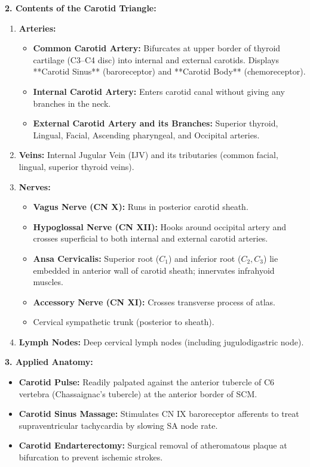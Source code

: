 \documentclass[11pt,a4paper]{article}
\begin{document}
\begin{ansbox}
\textbf{2. Contents of the Carotid Triangle:}
\begin{enumerate}[leftmargin=*]
    \item \textbf{Arteries:}
    \begin{itemize}
        \item \textbf{Common Carotid Artery:} Bifurcates at upper border of thyroid cartilage (C3--C4 disc) into internal and external carotids. Displays **Carotid Sinus** (baroreceptor) and **Carotid Body** (chemoreceptor).
        \item \textbf{Internal Carotid Artery:} Enters carotid canal without giving any branches in the neck.
        \item \textbf{External Carotid Artery and its Branches:} Superior thyroid, Lingual, Facial, Ascending pharyngeal, and Occipital arteries.
    \end{itemize}
    \item \textbf{Veins:} Internal Jugular Vein (IJV) and its tributaries (common facial, lingual, superior thyroid veins).
    \item \textbf{Nerves:}
    \begin{itemize}
        \item \textbf{Vagus Nerve (CN X):} Runs in posterior carotid sheath.
        \item \textbf{Hypoglossal Nerve (CN XII):} Hooks around occipital artery and crosses superficial to both internal and external carotid arteries.
        \item \textbf{Ansa Cervicalis:} Superior root ($C_1$) and inferior root ($C_2, C_3$) lie embedded in anterior wall of carotid sheath; innervates infrahyoid muscles.
        \item \textbf{Accessory Nerve (CN XI):} Crosses transverse process of atlas.
        \item Cervical sympathetic trunk (posterior to sheath).
    \end{itemize}
    \item \textbf{Lymph Nodes:} Deep cervical lymph nodes (including jugulodigastric node).
\end{enumerate}

\textbf{3. Applied Anatomy:}
\begin{itemize}[leftmargin=*]
    \item \textbf{Carotid Pulse:} Readily palpated against the anterior tubercle of C6 vertebra (Chassaignac's tubercle) at the anterior border of SCM.
    \item \textbf{Carotid Sinus Massage:} Stimulates CN IX baroreceptor afferents to treat supraventricular tachycardia by slowing SA node rate.
    \item \textbf{Carotid Endarterectomy:} Surgical removal of atheromatous plaque at bifurcation to prevent ischemic strokes.
\end{itemize}
\end{ansbox}
\end{document}
